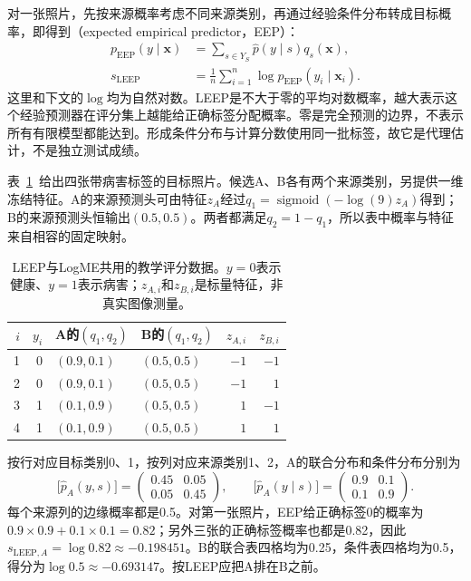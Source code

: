 对一张照片，先按来源概率考虑不同来源类别，再通过经验条件分布转成目标概率，即得到（expected empirical predictor，EEP）：
\begin{equation}
  \begin{aligned}
    p_{\mathrm{EEP}}(y\mid\bm x)
    &=\sum_{s\in Y_S}\hat p(y\mid s)q_s(\bm x),\\
    s_{\mathrm{LEEP}}
    &=\frac1n\sum_{i=1}^{n}
      \log p_{\mathrm{EEP}}(y_i\mid\bm x_i).
  \end{aligned}
  \label{eq:ket-reuse-leep-score}
\end{equation}
这里和下文的$\log$均为自然对数。LEEP是不大于零的平均对数概率，越大表示这个经验预测器在评分集上越能给正确标签分配概率。零是完全预测的边界，不表示所有有限模型都能达到。形成条件分布与计算分数使用同一批标签，故它是代理估计，不是独立测试成绩。

表~\ref{tab:ket-reuse-score-data}~给出四张带病害标签的目标照片。候选A、B各有两个来源类别，另提供一维冻结特征。A的来源预测头可由特征$z_A$经过$q_1=\operatorname{sigmoid}(-\log(9)z_A)$得到；B的来源预测头恒输出$(0.5,0.5)$。两者都满足$q_2=1-q_1$，所以表中概率与特征来自相容的固定映射。

\begin{table}[htbp]
  \centering
  \small
  \begin{tabularx}{\linewidth}{rrXXrr}
    \toprule
    $i$ & $y_i$ & A的$(q_1,q_2)$ & B的$(q_1,q_2)$ & $z_{A,i}$ & $z_{B,i}$ \\
    \midrule
    1 & 0 & $(0.9,0.1)$ & $(0.5,0.5)$ & $-1$ & $-1$ \\
    2 & 0 & $(0.9,0.1)$ & $(0.5,0.5)$ & $-1$ & $1$ \\
    3 & 1 & $(0.1,0.9)$ & $(0.5,0.5)$ & $1$ & $-1$ \\
    4 & 1 & $(0.1,0.9)$ & $(0.5,0.5)$ & $1$ & $1$ \\
    \bottomrule
  \end{tabularx}
  \caption{LEEP与LogME共用的教学评分数据。$y=0$表示健康、$y=1$表示病害；$z_{A,i}$和$z_{B,i}$是标量特征，非真实图像测量。}
  \label{tab:ket-reuse-score-data}
\end{table}

按行对应目标类别0、1，按列对应来源类别1、2，A的联合分布和条件分布分别为
\[
  \bigl[\hat p_A(y,s)\bigr]=
  \begin{pmatrix}0.45&0.05\\0.05&0.45\end{pmatrix},
  \qquad
  \bigl[\hat p_A(y\mid s)\bigr]=
  \begin{pmatrix}0.9&0.1\\0.1&0.9\end{pmatrix}.
\]
每个来源列的边缘概率都是0.5。对第一张照片，EEP给正确标签0的概率为$0.9\times0.9+0.1\times0.1=0.82$；另外三张的正确标签概率也都是0.82，因此$s_{\mathrm{LEEP},A}=\log0.82\approx-0.198451$。B的联合表四格均为0.25，条件表四格均为0.5，得分为$\log0.5\approx-0.693147$。按LEEP应把A排在B之前。

